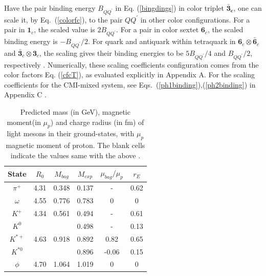 \documentclass[prt,twocolumn,floatfix,nofootinbib]{revtex4}
\begin{document}
Have the pair binding energy $B_{QQ^{\prime}}$ in Eq. (\ref{bingdings}) in color triplet $\boldsymbol{\bar{3}_{c}}$, one can scale it, by Eq.~(\ref{colorfc}), to the pair $QQ^{\prime}$ in other color configurations.
For a pair in $\boldsymbol{1}_{c}$, the scaled value is $2B_{QQ^{\prime}}$. For a pair in color sextet $\boldsymbol{6}_{c}$, the scaled binding energy is $-B_{QQ^{\prime}}/2$. For quark and antiquark within tetraquark in $\boldsymbol{6}_{c}\otimes\boldsymbol{\bar{6}}_{c}$ and $\boldsymbol{\bar{3}}_{c}\otimes\boldsymbol{3}_{c}$, the scaling gives their binding energies to be $5B_{QQ^{\prime}}/4$ and $B_{QQ^{\prime}}/2$, respectively . Numerically, these scaling coefficients configuration comes from the color factors Eq. (\ref{cfcT}), as evaluated explicitly in Appendix A. For the scaling coefficients for the CMI-mixed system, see Eqs.~(\ref{ph1binding}),(\ref{ph2binding}) in Appendix C .

\renewcommand{\tabcolsep}{0.37cm}
\renewcommand{\arraystretch}{1.3}
\begin{table}[!htbp]
    \caption{Predicted mass (in GeV), magnetic moment(in $\mu_{p}$) and charge radius (in fm) of light mesons in their ground-states, with $\mu_{p}$ magnetic moment of proton. The blank cells indicate the values same with the above .}
    \label{tab:lightmeson}
    \begin{tabular}{cccccc}
        \hline\hline
        {\rm State}         &$R_{0}$    &$M_{bag}$  &$M_{exp}$  &$\mu_{bag}/\mu_{p}$    &$r_{E}$ \\ \hline
        $\pi^{+}$ 	        &4.31	    &0.348	    &0.137	    &-	                    &0.62 \\
        $\omega$ 	        &4.55	    &0.776	    &0.783	    &0                      &0 \\
        $K^{+}$ 	        &4.34	    &0.561	    &0.494	    &-                      &0.61 \\
        $K^{0}$ 		    &           &           &0.498	    &-	                    &0.13 \\
        $K^{\ast +}$ 	    &4.63	    &0.918	    &0.892	    &0.82                   &0.65 \\
        $K^{\ast 0}$ 	    &           &           &0.896	    &-0.06	                &0.15 \\
        $\phi$ 	            &4.70	    &1.064	    &1.019	    &0                      &0 \\
        \hline\hline
    \end{tabular}
\end{table}
\end{document}

